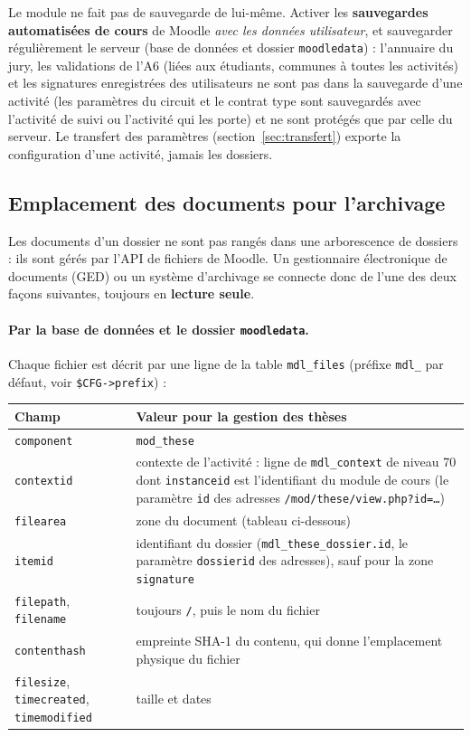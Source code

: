 \documentclass[11pt,a4paper]{article}
\begin{document}
\begin{attention}
Le module ne fait pas de sauvegarde de lui-même. Activer les
\textbf{sauvegardes automatisées de cours} de Moodle \emph{avec les données
utilisateur}, et sauvegarder régulièrement le serveur (base de données et
dossier \texttt{moodledata}) : l'annuaire du jury, les validations de l'A6 (liées
aux étudiants, communes à toutes les activités) et les signatures enregistrées
des utilisateurs ne sont pas dans la
sauvegarde d'une activité (les paramètres du circuit et le contrat type sont
sauvegardés avec l'activité de suivi ou l'activité qui les porte) et ne sont protégés que par celle du serveur. Le
transfert des paramètres (section~\ref{sec:transfert}) exporte la
configuration d'une activité, jamais les dossiers.
\end{attention}

\subsection{Emplacement des documents pour l'archivage}\label{sec:archivage}

Les documents d'un dossier ne sont pas rangés dans une arborescence de
dossiers : ils sont gérés par l'API de fichiers de Moodle. Un gestionnaire
électronique de documents (GED) ou un système d'archivage se connecte donc de
l'une des deux façons suivantes, toujours en \textbf{lecture seule}.

\paragraph{Par la base de données et le dossier \texttt{moodledata}.} Chaque
fichier est décrit par une ligne de la table \texttt{mdl\_files} (préfixe
\texttt{mdl\_} par défaut, voir \texttt{\$CFG->prefix}) :

\begin{center}
\small
\begin{tabularx}{\linewidth}{@{}l X@{}}
\toprule
\textbf{Champ} & \textbf{Valeur pour la gestion des thèses} \\
\midrule
\texttt{component} & \texttt{mod\_these} \\
\texttt{contextid} & contexte de l'activité : ligne de \texttt{mdl\_context} de
niveau 70 dont \texttt{instanceid} est l'identifiant du module de cours
(le paramètre \texttt{id} des adresses \texttt{/mod/these/view.php?id=\ldots}) \\
\texttt{filearea} & zone du document (tableau ci-dessous) \\
\texttt{itemid} & identifiant du dossier (\texttt{mdl\_these\_dossier.id}, le
paramètre \texttt{dossierid} des adresses), sauf pour la zone
\texttt{signature} \\
\texttt{filepath}, \texttt{filename} & toujours \texttt{/}, puis le nom du fichier \\
\texttt{contenthash} & empreinte SHA-1 du contenu, qui donne l'emplacement
physique du fichier \\
\texttt{filesize}, \texttt{timecreated}, \texttt{timemodified} & taille et dates \\
\bottomrule
\end{tabularx}
\end{center}
\end{document}
